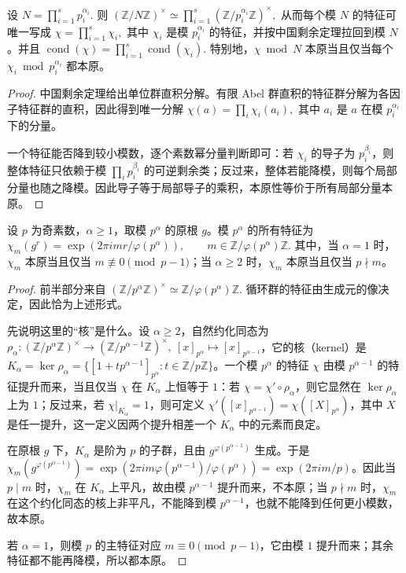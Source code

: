 \documentclass[oneside]{AJbook}
\newcommand{\Z}{\mathbb Z}
\newcommand{\U}[1]{(\Z/#1\Z)^\times}
\newcommand{\Cyc}[1]{\Z/#1\Z}
\newcommand{\expi}[1]{\exp(2\pi i #1)}
\providecommand{\cond}{\operatorname{cond}}
\begin{document}
\begin{theorem}[中国剩余定理下的分解]
设
\(
  N=\prod_{i=1}^s p_i^{\alpha_i}.
\)
则
\(
  \U N\simeq \prod_{i=1}^s \U{p_i^{\alpha_i}},
\)
从而每个模 $N$ 的特征可唯一写成
\(
  \chi=\prod_{i=1}^s\chi_i,
\)
其中 $\chi_i$ 是模 $p_i^{\alpha_i}$ 的特征，并按中国剩余定理拉回到模 $N$。并且
\(
  \cond(\chi)=\prod_{i=1}^s \cond(\chi_i).
\)
特别地，$\chi\bmod N$ 本原当且仅当每个 $\chi_i\bmod p_i^{\alpha_i}$ 都本原。
\end{theorem}

\begin{proof}
中国剩余定理给出单位群直积分解。有限 Abel 群直积的特征群分解为各因子特征群的直积，因此得到唯一分解
\(
  \chi(a)=\prod_i \chi_i(a_i),
\)
其中 $a_i$ 是 $a$ 在模 $p_i^{\alpha_i}$ 下的分量。

一个特征能否降到较小模数，逐个素数幂分量判断即可：若 $\chi_i$ 的导子为 $p_i^{\beta_i}$，则整体特征只依赖于模
\(
  \prod_i p_i^{\beta_i}
\)
的可逆剩余类；反过来，整体若能降模，则每个局部分量也随之降模。因此导子等于局部导子的乘积，本原性等价于所有局部分量本原。
\end{proof}

\begin{theorem}[素数幂模特征的指标表示]
设 $p$ 为奇素数，$\alpha\ge1$，取模 $p^\alpha$ 的原根 $g$。模 $p^\alpha$ 的所有特征为
\(
  \chi_m(g^r)=\expi{mr/\varphi(p^\alpha)},
  \qquad
  m\in\Z/\varphi(p^\alpha)\Z.
\)
其中，当 \(\alpha=1\) 时，\(\chi_m\) 本原当且仅当 \(m\not\equiv0\pmod {p-1}\)；当 \(\alpha\ge2\) 时，\(\chi_m\) 本原当且仅当 \(p\nmid m\)。
\end{theorem}

\begin{proof}
前半部分来自
\(
  \U{p^\alpha}\simeq \Cyc{\varphi(p^\alpha)}.
\)
循环群的特征由生成元的像决定，因此恰为上述形式。

先说明这里的“核”是什么。设 \(\alpha\ge2\)，自然约化同态为
\(\rho_\alpha:\U{p^\alpha}\to\U{p^{\alpha-1}},\ [x]_{p^\alpha}\mapsto [x]_{p^{\alpha-1}}\)，它的核（kernel）是
\(K_\alpha=\ker\rho_\alpha=\{[1+tp^{\alpha-1}]_{p^\alpha}:t\in\Z/p\Z\}\)。一个模 \(p^\alpha\) 的特征 \(\chi\) 由模 \(p^{\alpha-1}\) 的特征提升而来，当且仅当 \(\chi\) 在 \(K_\alpha\) 上恒等于 \(1\)：若 \(\chi=\chi'\circ\rho_\alpha\)，则它显然在 \(\ker\rho_\alpha\) 上为 \(1\)；反过来，若 \(\chi|_{K_\alpha}=1\)，则可定义 \(\chi'([x]_{p^{\alpha-1}})=\chi([X]_{p^\alpha})\)，其中 \(X\) 是任一提升，这一定义因两个提升相差一个 \(K_\alpha\) 中的元素而良定。

在原根 \(g\) 下，\(K_\alpha\) 是阶为 \(p\) 的子群，且由 \(g^{\varphi(p^{\alpha-1})}\) 生成。于是
\(\chi_m(g^{\varphi(p^{\alpha-1})})=\expi{m\varphi(p^{\alpha-1})/\varphi(p^\alpha)}=\expi{m/p}\)。因此当 \(p\mid m\) 时，\(\chi_m\) 在 \(K_\alpha\) 上平凡，故由模 \(p^{\alpha-1}\) 提升而来，不本原；当 \(p\nmid m\) 时，\(\chi_m\) 在这个约化同态的核上非平凡，不能降到模 \(p^{\alpha-1}\)，也就不能降到任何更小模数，故本原。

若 \(\alpha=1\)，则模 \(p\) 的主特征对应 \(m\equiv0\pmod {p-1}\)，它由模 \(1\) 提升而来；其余特征都不能再降模，所以都本原。
\end{proof}
\end{document}
